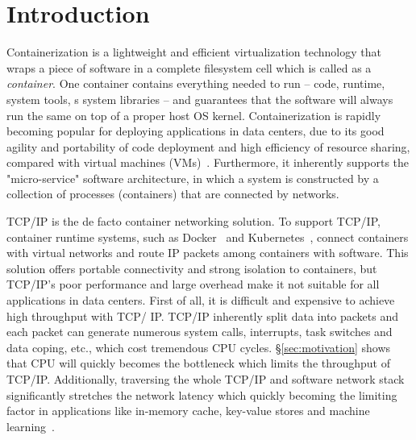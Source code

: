 \section{Introduction} \label{sec:introduction}


Containerization is a lightweight and efficient virtualization technology that 
wraps a piece of software in a complete filesystem cell which is called as a 
{\em container}. 
One container contains everything needed to run -- code, runtime, system tools, s
system libraries -- and guarantees that the software will always run the same on 
top of a proper host OS kernel. Containerization is rapidly
becoming popular for deploying applications in data centers, 
due to its good agility 
and portability of code deployment and high efficiency of resource sharing, 
compared with virtual machines (VMs)~\cite{?}. 
Furthermore, it inherently supports
the "micro-service" software architecture, in which a system is constructed by 
a collection of processes (containers) that are connected by networks.


TCP/IP is the de facto container networking solution. To support TCP/IP, 
container runtime systems, such as Docker~\cite{?} and
Kubernetes~\cite{?}, connect containers with virtual networks and route IP 
packets among containers with software. This solution offers portable 
connectivity and strong isolation to containers, but TCP/IP's poor performance
and large overhead make it not suitable for all applications in data centers.
First of all, it is difficult and expensive to achieve high throughput with TCP/
IP. TCP/IP inherently split data into packets and each packet can generate 
numerous system calls, interrupts, task switches and data coping, etc., which 
cost tremendous CPU cycles. \S\ref{sec:motivation} shows that CPU will quickly 
becomes the bottleneck which limits the throughput of TCP/IP. Additionally, 
traversing the whole TCP/IP and software network stack significantly stretches 
the network latency which quickly becoming the limiting factor in applications
like in-memory cache, key-value stores and machine learning~\cite{?}.

